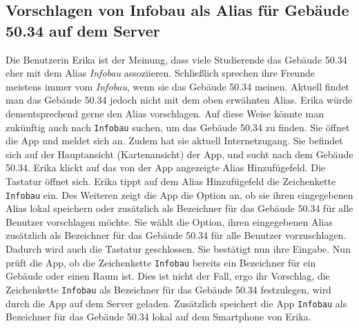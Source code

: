 \subsection{Vorschlagen von Infobau als \Gls{Alias} für Gebäude 50.34 auf dem Server}

Die Benutzerin Erika ist der Meinung, dass viele Studierende das Gebäude 50.34 eher mit dem \Gls{Alias} \textit{Infobau} assoziieren.
Schließlich sprechen ihre Freunde meistens immer vom \textit{Infobau}, wenn sie das Gebäude 50.34 meinen.
Aktuell findet man das Gebäude 50.34 jedoch nicht mit dem oben erwähnten \Gls{Alias}.
Erika würde dementsprechend gerne den \Gls{Alias} vorschlagen.
Auf diese Weise könnte man zukünftig auch nach \texttt{Infobau} suchen, um das Gebäude 50.34 zu finden.
Sie öffnet die App und meldet sich an.
Zudem hat sie aktuell Internetzugang.
Sie befindet sich auf der Hauptansicht (\Gls{Kartenansicht}) der App, und sucht nach dem Gebäude 50.34.
Erika klickt auf das von der App angezeigte \Gls{Alias} Hinzufügefeld. 
Die Tastatur öffnet sich.
Erika tippt auf dem \Gls{Alias} Hinzufügefeld die \Gls{Zeichenkette} \texttt{Infobau} ein.
Des Weiteren zeigt die App die Option an, ob sie ihren eingegebenen \Gls{Alias} lokal speichern oder zusätzlich als Bezeichner für das Gebäude 50.34 für alle Benutzer vorschlagen möchte.
Sie wählt die Option, ihren eingegebenen \Gls{Alias} zusätzlich als Bezeichner für das Gebäude 50.34 für alle Benutzer vorzuschlagen. 
Dadurch wird auch die Tastatur geschlossen. 
Sie bestätigt nun ihre Eingabe. 
Nun prüft die App, ob die \Gls{Zeichenkette} \texttt{Infobau} bereits ein Bezeichner für ein Gebäude oder einen Raum ist. 
Dies ist nicht der Fall, ergo ihr Vorschlag, die \Gls{Zeichenkette} \texttt{Infobau} als Bezeichner für das Gebäude 50.34 festzulegen, wird durch die App auf dem \Gls{Server} geladen. 
Zusätzlich speichert die App \texttt{Infobau} als Bezeichner für das Gebäude 50.34 lokal auf dem Smartphone von Erika.
